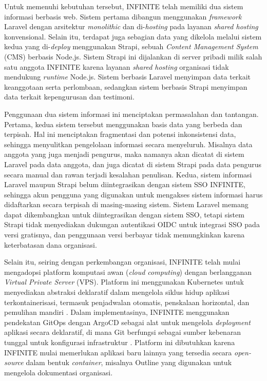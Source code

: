 Untuk memenuhi kebutuhan tersebut, INFINITE telah memiliki dua sistem informasi berbasis web. Sistem pertama dibangun menggunakan \textit{framework} Laravel dengan arsitektur \textit{monolithic} dan di-\textit{hosting} pada layanan \textit{shared hosting} konvensional. Selain itu, terdapat juga sebagian data yang dikelola melalui sistem kedua yang di-\textit{deploy} menggunakan Strapi, sebuah \textit{Content Management System} (CMS) berbasis Node.js. Sistem Strapi ini dijalankan di server pribadi milik salah satu anggota INFINITE karena layanan \textit{shared hosting} organisasi tidak mendukung \textit{runtime} Node.js. Sistem berbasis Laravel menyimpan data terkait keanggotaan serta perlombaan, sedangkan sistem berbasis Strapi menyimpan data terkait kepengurusan dan testimoni.

Penggunaan dua sistem informasi ini menciptakan permasalahan dan tantangan. Pertama, kedua sistem tersebut menggunakan basis data yang berbeda dan terpisah. Hal ini menciptakan fragmentasi dan potensi inkonsistensi data, sehingga menyulitkan pengelolaan informasi secara menyeluruh. Misalnya data anggota yang juga menjadi pengurus, maka namanya akan dicatat di sistem Laravel pada data anggota, dan juga dicatat di sistem Strapi pada data pengurus secara manual dan rawan terjadi kesalahan penulisan. Kedua, sistem informasi Laravel maupun Strapi belum diintegrasikan dengan sistem SSO INFINITE, sehingga akun pengguna yang digunakan untuk mengakses sistem informasi harus didaftarkan secara terpisah di masing-masing sistem. Sistem Laravel memang dapat dikembangkan untuk diintegrasikan dengan sistem SSO, tetapi sistem Strapi tidak menyediakan dukungan autentikasi OIDC untuk integrasi SSO pada versi gratisnya, dan penggunaan versi berbayar tidak memungkinkan karena keterbatasan dana organisasi.

Selain itu, seiring dengan perkembangan organisasi, INFINITE telah mulai mengadopsi platform komputasi awan (\textit{cloud computing}) dengan berlangganan \textit{Virtual Private Server} (VPS). Platform ini menggunakan Kubernetes untuk menyediakan abstraksi deklaratif dalam mengelola siklus hidup aplikasi terkontainerisasi, termasuk penjadwalan otomatis, penskalaan horizontal, dan pemulihan mandiri \citep{Burns_2016_Borg}. Dalam implementasinya, INFINITE menggunakan pendekatan GitOps dengan ArgoCD sebagai alat untuk mengelola \textit{deployment} aplikasi secara deklaratif, di mana Git berfungsi sebagai sumber kebenaran tunggal untuk konfigurasi infrastruktur \citep{Limoncelli_2018_GitOps, ArgoCD_2024_Docs}. Platform ini dibutuhkan karena INFINITE mulai memerlukan aplikasi baru lainnya yang tersedia secara \textit{open-source} dalam bentuk \textit{container}, misalnya Outline yang digunakan untuk mengelola dokumentasi organisasi.

